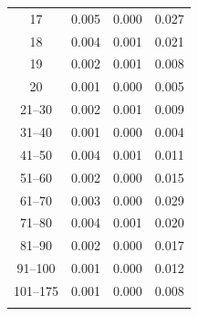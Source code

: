 \begin{table}
\begin{tabular}{cccc}
17 & 0.005 & 0.000 &  0.027\\
18 & 0.004 & 0.001 &  0.021\\
19 & 0.002 & 0.001 &  0.008\\
20 & 0.001 & 0.000 &  0.005\\
21--30 & 0.002  & 0.001 & 0.009\\
31--40 & 0.001 & 0.000 & 0.004\\
41--50 & 0.004 & 0.001 & 0.011\\
51--60 & 0.002 & 0.000 & 0.015\\
61--70 & 0.003 & 0.000 & 0.029\\
71--80 & 0.004 & 0.001 & 0.020\\
81--90 & 0.002 & 0.000 & 0.017\\
91--100 & 0.001 & 0.000 & 0.012\\
101--175 & 0.001 &  0.000 & 0.008\\
\noalign{\smallskip}\hline
\end{tabular}
\end{table}


